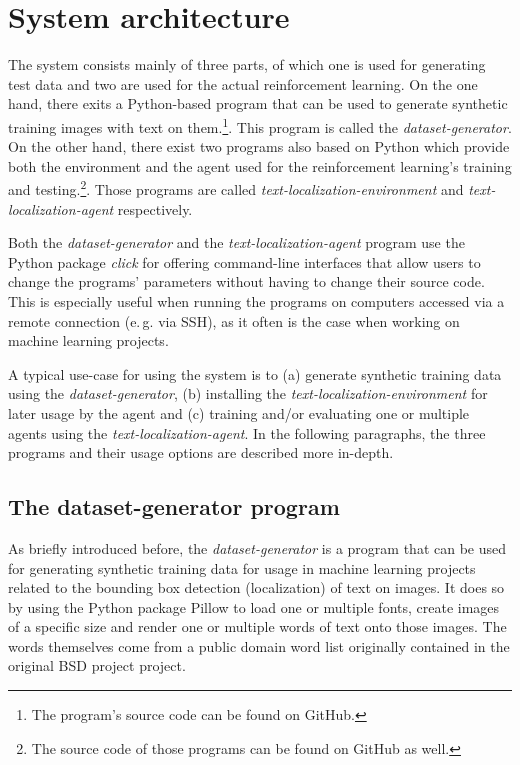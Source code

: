 \section{System architecture}

The system consists mainly of three parts, of which one is used for generating test data and two are used for the actual reinforcement learning.
On the one hand, there exits a Python-based program that can be used to generate synthetic training images with text on them.\footnote{The program's source code can be found on GitHub.\cite{GitHubDatasetGenerator}}. 
This program is called the \textit{dataset-generator}.
On the other hand, there exist two programs also based on Python which provide both the environment and the agent used for the reinforcement learning's training and testing.\footnote{The source code of those programs can be found on GitHub as well.\cite{GitHubTextLocalizationEnvironment}\cite{GitHubTextLocalizationAgent}}. 
Those programs are called \textit{text-localization-environment} and \textit{text-localization-agent} respectively. 

Both the \textit{dataset-generator} and the \textit{text-localization-agent} program use the Python package \textit{click}\cite{PythonPackageClick} for offering command-line interfaces that allow users to change the programs' parameters without having to change their source code.
This is especially useful when running the programs on computers accessed via a remote connection (e.\,g. via SSH), as it often is the case when working on machine learning projects.

A typical use-case for using the system is to (a) generate synthetic training data using the \textit{dataset-generator}, (b) installing the \textit{text-localization-environment} for later usage by the agent and (c) training and/or evaluating one or multiple agents using the \textit{text-localization-agent}. 
In the following paragraphs, the three programs and their usage options are described more in-depth.

\subsection{The dataset-generator program}

As briefly introduced before, the \textit{dataset-generator} is a program that can be used for generating synthetic training data for usage in machine learning projects related to the bounding box detection (localization) of text on images. 
It does so by using the Python package Pillow\cite{PythonPackagePillow} to load one or multiple fonts, create images of a specific size and render one or multiple words of text onto those images.
The words themselves come from a public domain word list originally contained in the original BSD project project.\cite{BSDWordlist}

